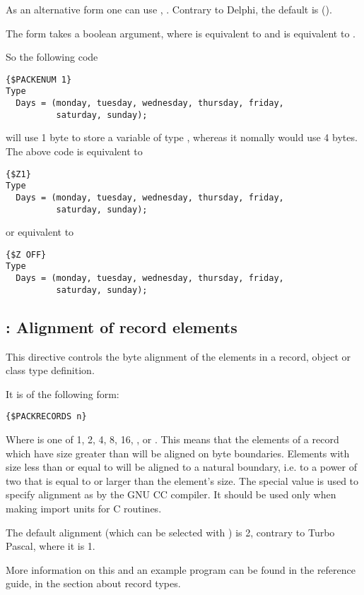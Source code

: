 As an alternative form one can use , 
. Contrary to Delphi, the default is ().

The  form takes a boolean argument, where  is equivalent
to  and  is equivalent to .

So the following code
\begin{verbatim}
{$PACKENUM 1}
Type
  Days = (monday, tuesday, wednesday, thursday, friday,
          saturday, sunday);
\end{verbatim}
will use 1 byte to store a variable of type , whereas it nomally
would use 4 bytes. The above code is equivalent to
\begin{verbatim}
{$Z1}
Type
  Days = (monday, tuesday, wednesday, thursday, friday,
          saturday, sunday);
\end{verbatim}
or equivalent to
\begin{verbatim}
{$Z OFF}
Type
  Days = (monday, tuesday, wednesday, thursday, friday,
          saturday, sunday);
\end{verbatim}

\subsection{ : Alignment of record elements}
\label{se:Packrecords}
This directive controls the byte alignment of the elements in a record,
object or class type definition.

It is of the following form:
\begin{verbatim}
{$PACKRECORDS n}
\end{verbatim}

Where  is one of 1, 2, 4, 8, 16, ,  or .
This means that the elements of a record which have size greater than 
will be aligned on  byte boundaries. Elements with size less than or
equal to  will be aligned to a natural boundary, i.e. to a power of
two that is equal to or larger than the element's size. The special value 
 is used to specify alignment as by the GNU CC compiler. It should 
be used only when making import units for C routines.

The default alignment (which can be selected with ) is 2,
contrary to Turbo Pascal, where it is 1.

More information on this and an example program can be found in the reference
guide, in the section about record types.

